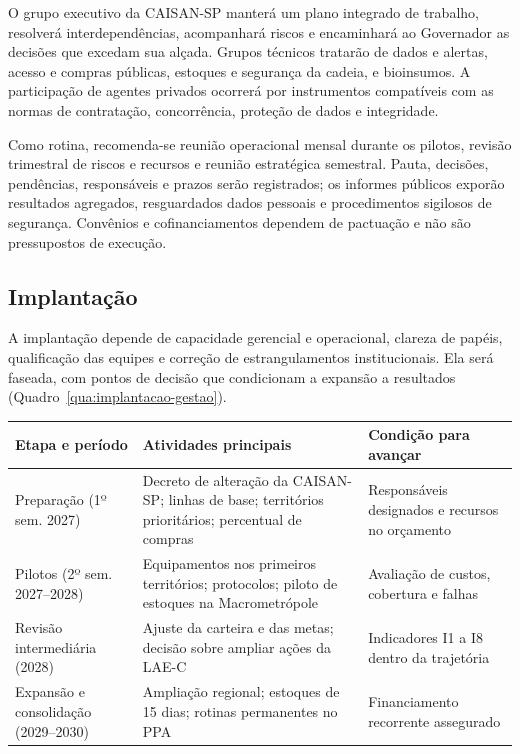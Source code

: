 \documentclass[
	12pt,				%
	openright,			%
	oneside,			%
	a4paper,			%
	chapter=TITLE,		%
	section=TITLE,		%
	english,			%
	french,				%
	spanish,			%
	brazil,				%
 ]{abntex2}
\begin{document}
O grupo executivo da CAISAN-SP manterá um plano integrado de trabalho, resolverá interdependências,
acompanhará riscos e encaminhará ao Governador as decisões que excedam sua
alçada. Grupos técnicos tratarão de dados e alertas, acesso e compras públicas,
estoques e segurança da cadeia, e bioinsumos. A participação de agentes privados
ocorrerá por instrumentos compatíveis com as normas de contratação,
concorrência, proteção de dados e integridade.

Como rotina, recomenda-se reunião operacional mensal durante os pilotos,
revisão trimestral de riscos e recursos e reunião estratégica semestral. Pauta,
decisões, pendências, responsáveis e prazos serão registrados; os informes
públicos exporão resultados agregados, resguardados dados pessoais e
procedimentos sigilosos de segurança. Convênios e cofinanciamentos dependem de
pactuação e não são pressupostos de execução.

\subsection{Implantação}
A implantação depende de capacidade gerencial e operacional, clareza de
papéis, qualificação das equipes e correção de estrangulamentos
institucionais. Ela será faseada, com pontos de decisão que condicionam a
expansão a resultados (Quadro~\ref{qua:implantacao-gestao}).

\begin{quadro}[!htbp]
\centering
\caption{Etapas de implantação e pontos de decisão}
\label{qua:implantacao-gestao}
\footnotesize
\renewcommand{\arraystretch}{1.05}
\setlength{\tabcolsep}{3pt}
\begin{tabularx}{\textwidth}{|>{\raggedright\arraybackslash}p{2.5cm}|>{\raggedright\arraybackslash}X|>{\raggedright\arraybackslash}p{4.2cm}|}
\hline
\textbf{Etapa e período} & \textbf{Atividades principais} & \textbf{Condição para avançar} \\
\hline
Preparação (1º sem. 2027) & Decreto de alteração da CAISAN-SP; linhas de base; territórios prioritários; percentual de compras & Responsáveis designados e recursos no orçamento \\
\hline
Pilotos (2º sem. 2027--2028) & Equipamentos nos primeiros territórios; protocolos; piloto de estoques na Macrometrópole & Avaliação de custos, cobertura e falhas \\
\hline
Revisão intermediária (2028) & Ajuste da carteira e das metas; decisão sobre ampliar ações da LAE-C & Indicadores I1 a I8 dentro da trajetória \\
\hline
Expansão e consolidação (2029--2030) & Ampliação regional; estoques de 15 dias; rotinas permanentes no PPA & Financiamento recorrente assegurado \\
\hline
\end{tabularx}
\end{quadro}
\end{document}
